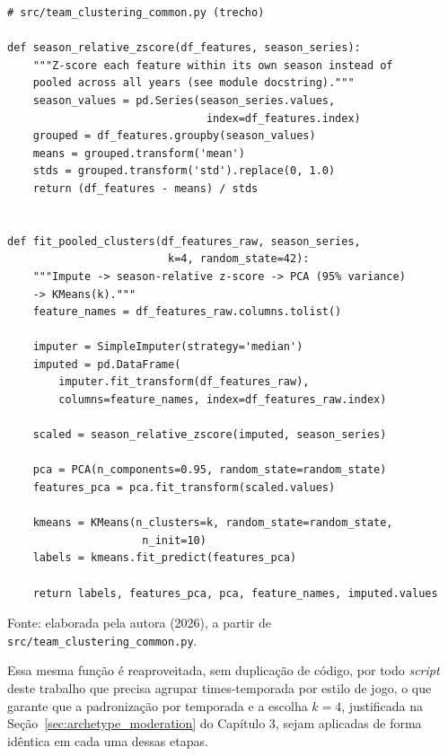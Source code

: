 \begin{codelisting}[htb]
\makeatletter
{}
\makeatother
\label{cod:py_kmeans}
\begin{verbatim}
# src/team_clustering_common.py (trecho)

def season_relative_zscore(df_features, season_series):
    """Z-score each feature within its own season instead of
    pooled across all years (see module docstring)."""
    season_values = pd.Series(season_series.values,
                               index=df_features.index)
    grouped = df_features.groupby(season_values)
    means = grouped.transform('mean')
    stds = grouped.transform('std').replace(0, 1.0)
    return (df_features - means) / stds


def fit_pooled_clusters(df_features_raw, season_series,
                         k=4, random_state=42):
    """Impute -> season-relative z-score -> PCA (95% variance)
    -> KMeans(k)."""
    feature_names = df_features_raw.columns.tolist()

    imputer = SimpleImputer(strategy='median')
    imputed = pd.DataFrame(
        imputer.fit_transform(df_features_raw),
        columns=feature_names, index=df_features_raw.index)

    scaled = season_relative_zscore(imputed, season_series)

    pca = PCA(n_components=0.95, random_state=random_state)
    features_pca = pca.fit_transform(scaled.values)

    kmeans = KMeans(n_clusters=k, random_state=random_state,
                     n_init=10)
    labels = kmeans.fit_predict(features_pca)

    return labels, features_pca, pca, feature_names, imputed.values
\end{verbatim}
\begin{flushleft}
\footnotesize Fonte: elaborada pela autora (2026), a partir de \texttt{src/team\_clustering\_common.py}.
\end{flushleft}
\end{codelisting}

Essa mesma função é reaproveitada, sem duplicação de código, por todo \textit{script} deste trabalho que precisa agrupar times-temporada por estilo de jogo, o que garante que a padronização por temporada e a escolha $k=4$, justificada na Seção~\ref{sec:archetype_moderation} do Capítulo 3, sejam aplicadas de forma idêntica em cada uma dessas etapas.

